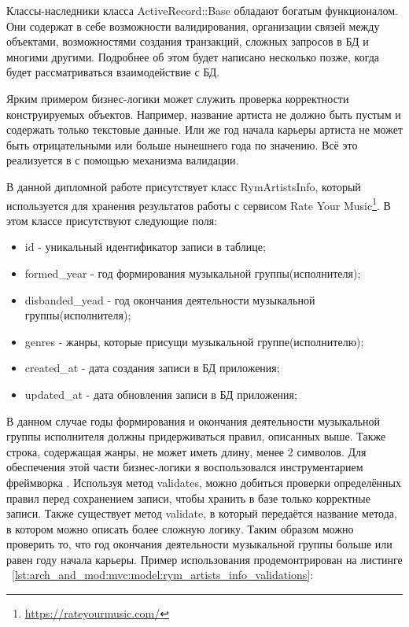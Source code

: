 Классы-наследники класса ActiveRecord::Base обладают богатым функционалом. Они содержат в себе возможности валидирования, организации связей между объектами, возможностями создания транзакций, сложных запросов в БД и многими другими. Подробнее об этом будет написано несколько позже, когда будет рассматриваться взаимодействие с БД.

Ярким примером бизнес-логики может служить проверка корректности конструируемых объектов. Например, название артиста не должно быть пустым и содержать только текстовые данные. Или же год начала карьеры артиста не может быть отрицательными или больше нынешнего года по значению. Всё это реализуется в \ror{} с помощью механизма валидации.

В данной дипломной работе присутствует класс RymArtistsInfo, который используется для хранения результатов работы с сервисом Rate Your Music\footnote{\url{https://rateyourmusic.com/}}. В этом классе присутствуют следующие поля:

\begin{itemize}
  \item id - уникальный идентификатор записи в таблице;
  \item formed\_year - год формирования музыкальной группы(исполнителя);
  \item disbanded\_yead - год окончания деятельности музыкальной группы(исполнителя);
  \item genres - жанры, которые присущи музыкальной группе(исполнителю);
  \item created\_at - дата создания записи в БД приложения;
  \item updated\_at - дата обновления записи в БД приложения;
\end{itemize}

В данном случае годы формирования и окончания деятельности музыкальной группы исполнителя должны придерживаться правил, описанных выше. Также строка, содержащая жанры, не может иметь длину, менее 2 символов. Для обеспечения этой части бизнес-логики я воспользовался инструментарием фреймворка \ror{}. Используя метод validates, можно добиться проверки определённых правил перед сохранением записи, чтобы хранить в базе только корректные записи. Также существует метод validate, в который передаётся название метода, в котором можно описать более сложную логику. Таким образом можно проверить то, что год окончания деятельности музыкальной группы больше или равен году начала карьеры. Пример использования продемонтрирован на листинге ~\ref{lst:arch_and_mod:mvc:model:rym_artists_info_validations}:

